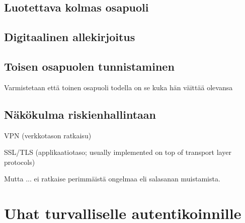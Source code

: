 \documentclass[english,gradu]{tktltiki}
\begin{document}
%



\subsection{Luotettava kolmas osapuoli} %
\label{sub:luotettava_kolmas_osapuoli}


\subsection{Digitaalinen allekirjoitus} %
\label{sub:digitaalinen_allekirjoitus}


\subsection{Toisen osapuolen tunnistaminen} %
\label{sub:toisen_osapuolen_tunnistaminen}
Varmistetaan että toinen osapuoli todella on se kuka hän väittää olevansa


\subsection{Näkökulma riskienhallintaan} %
\label{sub:näkökulma_riskienhallintaan}
VPN (verkkotason ratkaisu)

SSL/TLS (applikaatiotaso; usually implemented on top of transport layer protocols)

Mutta ... ei ratkaise perimmäistä ongelmaa eli salasanan muistamista.



\section{Uhat turvalliselle autentikoinnille} %
\label{sec:uhat_turvalliselle_autentikoinnille}
\end{document}
